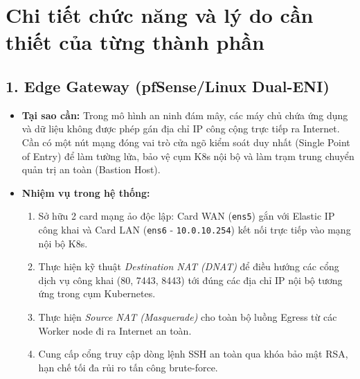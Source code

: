 \section{Chi tiết chức năng và lý do cần thiết của từng thành phần}

\subsection{1. Edge Gateway (pfSense/Linux Dual-ENI)}
\begin{itemize}
    \item \textbf{Tại sao cần:} Trong mô hình an ninh đám mây, các máy chủ chứa ứng dụng và dữ liệu không được phép gán địa chỉ IP công cộng trực tiếp ra Internet. Cần có một nút mạng đóng vai trò cửa ngõ kiểm soát duy nhất (Single Point of Entry) để làm tường lửa, bảo vệ cụm K8s nội bộ và làm trạm trung chuyển quản trị an toàn (Bastion Host).
    \item \textbf{Nhiệm vụ trong hệ thống:}
    \begin{enumerate}
        \item Sở hữu 2 card mạng ảo độc lập: Card WAN (\texttt{ens5}) gắn với Elastic IP công khai và Card LAN (\texttt{ens6} - \texttt{10.0.10.254}) kết nối trực tiếp vào mạng nội bộ K8s.
        \item Thực hiện kỹ thuật \textit{Destination NAT (DNAT)} để điều hướng các cổng dịch vụ công khai (80, 7443, 8443) tới đúng các địa chỉ IP nội bộ tương ứng trong cụm Kubernetes.
        \item Thực hiện \textit{Source NAT (Masquerade)} cho toàn bộ luồng Egress từ các Worker node đi ra Internet an toàn.
        \item Cung cấp cổng truy cập dòng lệnh SSH an toàn qua khóa bảo mật RSA, hạn chế tối đa rủi ro tấn công brute-force.
    \end{enumerate}
\end{itemize}


